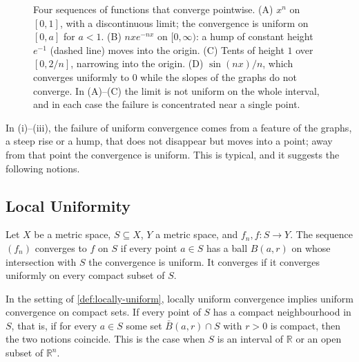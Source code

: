 \begin{figure}
{}
\caption{Four sequences of functions that converge pointwise. (A) $x^n$ on $[0,1]$, with a discontinuous limit; the convergence is uniform on $[0,a]$ for $a<1$. (B) $nxe^{-nx}$ on $[0,\infty)$: a hump of constant height $e^{-1}$ (dashed line) moves into the origin. (C) Tents of height $1$ over $[0,2/n]$, narrowing into the origin. (D) $\sin(nx)/n$, which converges uniformly to $0$ while the slopes of the graphs do not converge. In (A)--(C) the limit is not uniform on the whole interval, and in each case the failure is concentrated near a single point.}
\label{fig:basic-examples}
\end{figure}

In (i)--(iii), the failure of uniform convergence comes from a feature of the graphs, a steep rise or a hump, that does not disappear but moves into a point; away from that point the convergence is uniform. This is typical, and it suggests the following notions.

\subsection{Local Uniformity}

\begin{definition}
\label{def:locally-uniform}
Let $X$ be a metric space, $S\subseteq X$, $Y$ a metric space, and $f_n,f\colon S\to Y$. The sequence $(f_n)$ converges  to $f$ on $S$ if every point $a\in S$ has a ball $B(a,r)$ on whose intersection with $S$ the convergence is uniform. It converges  if it converges uniformly on every compact subset of $S$.
\end{definition}

\begin{proposition}
\label{prop:locally-uniform}
In the setting of \cref{def:locally-uniform}, locally uniform convergence implies uniform convergence on compact sets. If every point of $S$ has a compact neighbourhood in $S$, that is, if for every $a\in S$ some set $\bar B(a,r)\cap S$ with $r>0$ is compact, then the two notions coincide. This is the case when $S$ is an interval of $\mathbb R$ or an open subset of $\mathbb R^n$.
\end{proposition}

